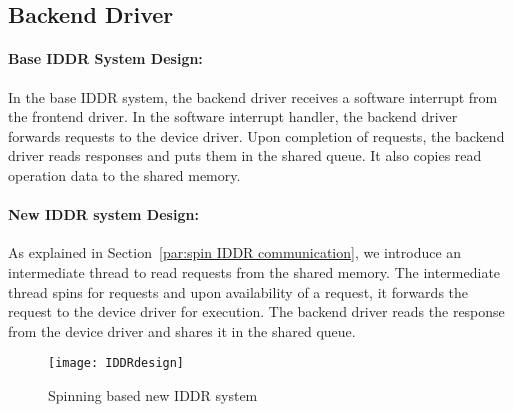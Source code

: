 \subsection{Backend Driver}
\paragraph{Base IDDR System Design:}
In the base IDDR system, the backend driver receives a software interrupt from the frontend driver. In the software interrupt handler, the backend driver forwards requests to the device driver. Upon completion of requests, the backend driver reads responses and puts them in the shared queue. It also copies read operation data to the shared memory. 

\paragraph{New IDDR system Design:}
As explained in Section~\ref{par:spin IDDR communication}, we introduce an intermediate thread to read requests from the shared memory. The intermediate thread spins for requests and upon availability of a request, it forwards the request to the device driver for execution. The backend driver reads the response from the device driver and shares it in the shared queue.
\begin{figure}[!ht]
\centering
\texttt{[image: IDDRdesign]}
\caption{Spinning based new IDDR system}
\label{fig:new IDDR system}
\end{figure}

    
